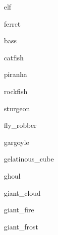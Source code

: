 \documentclass[letterpaper,serif]{module}
\begin{document}
\begin{newmonster}{elf}\end{newmonster}

\begin{newmonster}{ferret}\end{newmonster}

\begin{newmonster}{bass}\end{newmonster}

\begin{newmonster}{catfish}\end{newmonster}

\begin{newmonster}{piranha}\end{newmonster}

\begin{newmonster}{rockfish}\end{newmonster}

\begin{newmonster}{sturgeon}\end{newmonster}

\begin{newmonster}{fly_robber}\end{newmonster}

\begin{newmonster}{gargoyle}\end{newmonster}

\begin{newmonster}{gelatinous_cube}\end{newmonster}

\begin{newmonster}{ghoul}\end{newmonster}

\begin{newmonster}{giant_cloud}\end{newmonster}

\begin{newmonster}{giant_fire}\end{newmonster}

\begin{newmonster}{giant_frost}\end{newmonster}
\end{document}
